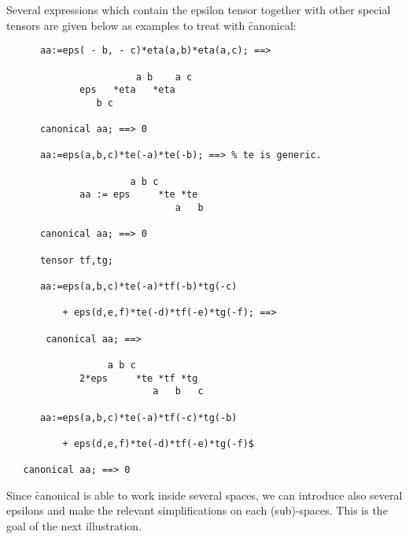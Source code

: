 Several expressions which contain the  epsilon tensor together
with other special tensors are given below as examples to treat
with \f{canonical}:
\begin{verbatim}
      aa:=eps( - b, - c)*eta(a,b)*eta(a,c); ==>

                       a b    a c
             eps   *eta   *eta
                b c

      canonical aa; ==> 0

      aa:=eps(a,b,c)*te(-a)*te(-b); ==> % te is generic.

                      a b c
             aa := eps     *te *te
                              a   b

      canonical aa; ==> 0

      tensor tf,tg;

      aa:=eps(a,b,c)*te(-a)*tf(-b)*tg(-c)

          + eps(d,e,f)*te(-d)*tf(-e)*tg(-f); ==>

       canonical aa; ==>

                  a b c
             2*eps     *te *tf *tg
                          a   b   c

      aa:=eps(a,b,c)*te(-a)*tf(-c)*tg(-b)

          + eps(d,e,f)*te(-d)*tf(-e)*tg(-f)$

   canonical aa; ==> 0
\end{verbatim}
Since \f{canonical} is able to work inside several
spaces, we can introduce also several epsilons and make the relevant
simplifications on each (sub)-spaces. This is the goal of the
next illustration.
